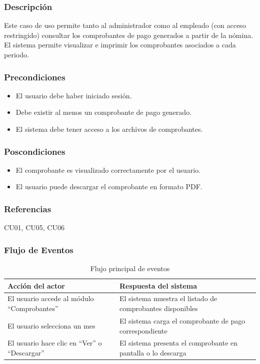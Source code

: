 \subsubsection*{Descripción}
Este caso de uso permite tanto al administrador como al empleado (con acceso restringido) consultar los comprobantes de pago generados a partir de la nómina. El sistema permite visualizar e imprimir los comprobantes asociados a cada periodo.

\subsubsection*{Precondiciones}
\begin{itemize}
	\item El usuario debe haber iniciado sesión.
	\item Debe existir al menos un comprobante de pago generado.
	\item El sistema debe tener acceso a los archivos de comprobantes.
\end{itemize}

\subsubsection*{Poscondiciones}
\begin{itemize}
	\item El comprobante es visualizado correctamente por el usuario.
	\item El usuario puede descargar el comprobante en formato PDF.
\end{itemize}

\subsubsection*{Referencias}
CU01, CU05, CU06

\subsubsection*{Flujo de Eventos}
\begin{table}[h]
	\centering
	\caption{Flujo principal de eventos}
	\begin{tabular}{|p{7cm}|p{7cm}|}
		\hline
		\textbf{Acción del actor}                   & \textbf{Respuesta del sistema}                               \\ \hline
		El usuario accede al módulo “Comprobantes”  & El sistema muestra el listado de comprobantes disponibles    \\ \hline
		El usuario selecciona un mes                & El sistema carga el comprobante de pago correspondiente      \\ \hline
		El usuario hace clic en “Ver” o “Descargar” & El sistema presenta el comprobante en pantalla o lo descarga \\ \hline
	\end{tabular}
\end{table}

